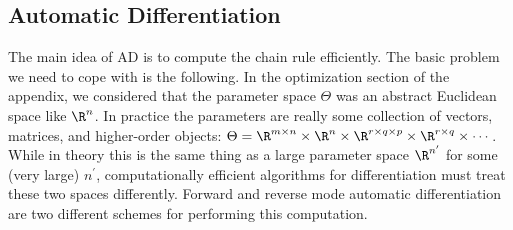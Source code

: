 \documentclass[../../book-main.tex]{subfiles}
\begin{document}
\subsection{Automatic Differentiation}

The main idea of AD is to compute the chain rule efficiently. 
The basic problem we need to cope with is the following. In the optimization section
of the appendix, we considered
that the parameter space \(\Theta\) was an abstract Euclidean space like
\(\R^{n}\). In practice the parameters are really some collection of vectors,
matrices, and higher-order objects: \(\Theta = \R^{m \times n} \times \R^{n}
\times \R^{r \times q \times p} \times \R^{r \times q} \times \cdots\). While in
theory this is the same thing as a large parameter space \(\R^{n^{\prime}}\) for
some (very large) \(n^{\prime}\), computationally efficient algorithms for differentiation must treat these two spaces differently. 
Forward and reverse mode automatic differentiation are two different schemes for
performing this computation.
\end{document}
